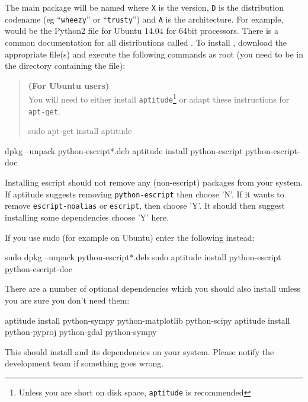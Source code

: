 The main package will be named  where \texttt{X} is the version, \texttt{D} 
is the distribution codename (eg ``\texttt{wheezy}'' or ``\texttt{trusty}'') and \texttt{A} is the architecture.
For example,  would be the Python2 file for Ubuntu $14.04$ for 64bit processors.
There is a common documentation for all distributions called .
To install \esfinley, download the appropriate  file(s) and execute the following 
commands as root (you need to be in the directory containing the file):

\begin{verse}
\textbf{(For Ubuntu users)}\\
You will need to either install \texttt{aptitude}\footnote{Unless you are short on disk space, \texttt{aptitude} 
is recommended} or adapt these instructions for \texttt{apt-get}.
\begin{shellCode}
sudo apt-get install aptitude
\end{shellCode}
\end{verse}

\begin{shellCode}
dpkg --unpack python-escript*.deb
aptitude install python-escript python-escript-doc
\end{shellCode}

Installing escript should not remove any (non-escript) packages from your system.
If aptitude suggests removing \texttt{python-escript} then choose 'N'.
If it wants to remove \texttt{escript-noalias} or \texttt{escript}, then choose 'Y'.
It should then suggest installing some dependencies choose 'Y' here.

If you use sudo (for example on Ubuntu) enter the following instead:
\begin{shellCode}
sudo dpkg --unpack python-escript*.deb
sudo aptitude install python-escript python-escript-doc
\end{shellCode}

There are a number of optional dependencies which you should also install unless you are sure you don't need them:
\begin{shellCode}
aptitude install python-sympy python-matplotlib python-scipy 
aptitude install python-pyproj python-gdal python-sympy
\end{shellCode}



This should install \esfinley and its dependencies on your system.
Please notify the development team if something goes wrong.


